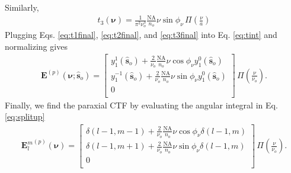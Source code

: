 \documentclass[11pt]{article}
\providecommand{\mb}[1]{\mathbf{#1}}
\providecommand{\so}[1]{\mathbf{\hat{s}}_o}
\providecommand{\bs}[1]{\boldsymbol{#1}}
\begin{document}
Similarly, 
\begin{align}
  t_3(\bs{\nu}) =
    \frac{1}{\pi^2 \nu_o^3}\frac{\text{NA}}{n_o}\nu\sin\phi_{\nu}\, \Pi\left(\frac{\nu}{a}\right)\label{eq:t3final}
\end{align}
Plugging Eqs. \ref{eq:t1final}, \ref{eq:t2final}, and \ref{eq:t3final} into Eq.
\ref{eq:tint} and normalizing gives
\begin{align}
  {\mb{E}}^{(p)}(\bs{\nu}; \so{}) =
\begin{bmatrix}
  y_1^1(\so{}) + \frac{2}{\nu_o}\frac{\text{NA}}{n_o}\nu\cos\phi_\nu y_1^0(\so{})\\
  y_1^{-1}(\so{}) + \frac{2}{\nu_o}\frac{\text{NA}}{n_o}\nu\sin\phi_\nu y_1^0(\so{})\\
  0\\
  \end{bmatrix}\, \Pi\left(\frac{\nu}{\nu_o}\right). \label{eq:paractfsp}
\end{align}
Finally, we find the paraxial CTF by evaluating the angular integral in Eq.
\ref{eq:splitup} 
\begin{align}
  {\mb{E}_l^m}^{(p)}(\bs{\nu}) =
\begin{bmatrix}
  \delta(l-1, m-1) + \frac{2}{\nu_o}\frac{\text{NA}}{n_o}\nu\cos\phi_\nu\delta(l-1, m)\\
  \delta(l-1, m+1) + \frac{2}{\nu_o}\frac{\text{NA}}{n_o}\nu\sin\phi_\nu\delta(l-1, m)\\
  0\\
  \end{bmatrix}\, \Pi\left(\frac{\nu}{\nu_o}\right).
\end{align}
\end{document}
